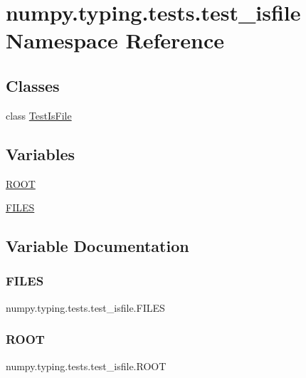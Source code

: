\hypertarget{namespacenumpy_1_1typing_1_1tests_1_1test__isfile}{}\section{numpy.\+typing.\+tests.\+test\+\_\+isfile Namespace Reference}
\label{namespacenumpy_1_1typing_1_1tests_1_1test__isfile}
\subsection*{Classes}
\begin{DoxyCompactItemize}
\item 
class \hyperlink{classnumpy_1_1typing_1_1tests_1_1test__isfile_1_1TestIsFile}{Test\+Is\+File}
\end{DoxyCompactItemize}
\subsection*{Variables}
\begin{DoxyCompactItemize}
\item 
\hyperlink{namespacenumpy_1_1typing_1_1tests_1_1test__isfile_ab2bf3c16e5773f5b631cb2b385c18b58}{R\+O\+OT}
\item 
\hyperlink{namespacenumpy_1_1typing_1_1tests_1_1test__isfile_a508b43deca505585dad093f6f3c77250}{F\+I\+L\+ES}
\end{DoxyCompactItemize}


\subsection{Variable Documentation}
\mbox{\label{namespacenumpy_1_1typing_1_1tests_1_1test__isfile_a508b43deca505585dad093f6f3c77250}} 
\subsubsection{\texorpdfstring{F\+I\+L\+ES}{FILES}}
{\footnotesize\ttfamily numpy.\+typing.\+tests.\+test\+\_\+isfile.\+F\+I\+L\+ES}

\mbox{\label{namespacenumpy_1_1typing_1_1tests_1_1test__isfile_ab2bf3c16e5773f5b631cb2b385c18b58}} 
\subsubsection{\texorpdfstring{R\+O\+OT}{ROOT}}
{\footnotesize\ttfamily numpy.\+typing.\+tests.\+test\+\_\+isfile.\+R\+O\+OT}

